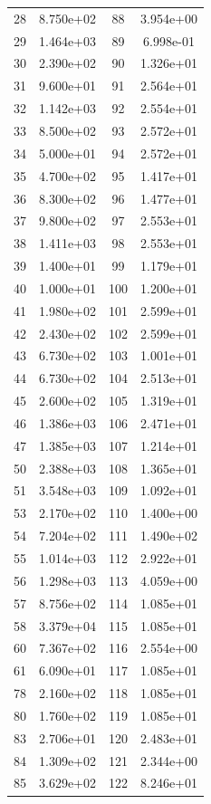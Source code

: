\documentclass[12pt]{article}
\begin{document}
\begin{longtable}{@{}cccc@{}}
28 & 8.750e+02 & 88 & 3.954e+00 \\
29 & 1.464e+03 & 89 & 6.998e-01 \\
30 & 2.390e+02 & 90 & 1.326e+01 \\
31 & 9.600e+01 & 91 & 2.564e+01 \\
32 & 1.142e+03 & 92 & 2.554e+01 \\
33 & 8.500e+02 & 93 & 2.572e+01 \\
34 & 5.000e+01 & 94 & 2.572e+01 \\
35 & 4.700e+02 & 95 & 1.417e+01 \\
36 & 8.300e+02 & 96 & 1.477e+01 \\
37 & 9.800e+02 & 97 & 2.553e+01 \\
38 & 1.411e+03 & 98 & 2.553e+01 \\
39 & 1.400e+01 & 99 & 1.179e+01 \\
40 & 1.000e+01 & 100 & 1.200e+01 \\
41 & 1.980e+02 & 101 & 2.599e+01 \\
42 & 2.430e+02 & 102 & 2.599e+01 \\
43 & 6.730e+02 & 103 & 1.001e+01 \\
44 & 6.730e+02 & 104 & 2.513e+01 \\
45 & 2.600e+02 & 105 & 1.319e+01 \\
46 & 1.386e+03 & 106 & 2.471e+01 \\
47 & 1.385e+03 & 107 & 1.214e+01 \\
50 & 2.388e+03 & 108 & 1.365e+01 \\
51 & 3.548e+03 & 109 & 1.092e+01 \\
53 & 2.170e+02 & 110 & 1.400e+00 \\
54 & 7.204e+02 & 111 & 1.490e+02 \\
55 & 1.014e+03 & 112 & 2.922e+01 \\
56 & 1.298e+03 & 113 & 4.059e+00 \\
57 & 8.756e+02 & 114 & 1.085e+01 \\
58 & 3.379e+04 & 115 & 1.085e+01 \\
60 & 7.367e+02 & 116 & 2.554e+00 \\
61 & 6.090e+01 & 117 & 1.085e+01 \\
78 & 2.160e+02 & 118 & 1.085e+01 \\
80 & 1.760e+02 & 119 & 1.085e+01 \\
83 & 2.706e+01 & 120 & 2.483e+01 \\
84 & 1.309e+02 & 121 & 2.344e+00 \\
85 & 3.629e+02 & 122 & 8.246e+01 \\

\end{longtable}
\end{document}
